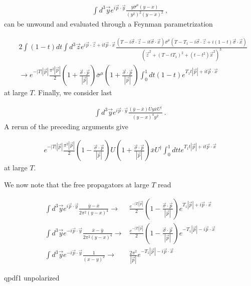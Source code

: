 \documentclass[11pt,aps,amsmath,amssymb,nofootinbib,notitlepage,longbibliography]{revtex4-1}
\begin{document}
\begin{align}
\int d^3 \vec{y}e^{i\vec{p}\cdot \vec{y}}\frac{y\bar \sigma^{\mu}(y-x)}{(y^2)^2(y-x)^2} \ ,
\end{align}
can be unwound and evaluated through a Feynman parametrization

\begin{align}
\label{T3}
&2\int (1-t)dt \int d^3 \vec{z}e^{i\vec{p}\cdot \vec{z}+it\vec{p}\cdot \vec{x}}\frac{(T-i\vec{\sigma} \cdot \vec{z}-it\vec{\sigma} \cdot \vec{x})\bar \sigma^{\mu}(T-T_1-i\vec{\sigma} \cdot \vec{z}+i(1-t)\vec{\sigma} \cdot \vec{x})}{(\vec{z}^2+(T-tT_1)^2+(t-t^2)\vec{x}^2)^3}\nonumber\\
&\rightarrow e^{-|T||\vec{p}|}\frac{\pi^2 |\vec{p}|}{2}(1+\frac{\vec{\sigma}\cdot \vec{p}}{|\vec{p}|})\bar \sigma^{\mu}(1+\frac{\vec{\sigma}\cdot \vec{p}}{|\vec{p}|})\int_{0}^{1}dt(1-t)e^{T_1t|\vec{p}|+it\vec{p}\cdot\vec{x}}
\end{align}
at large $T$.  Finally, we consider last

\begin{align}
\int d^3 \vec{y}e^{i\vec{p}\cdot \vec{y}}\frac{(\bar y-\bar x)Uy\bar xU^{\dagger}}{(y-x)^4y^2} \ .
\end{align}
A rerun of the preceding arguments give

\begin{align}
\label{T4}
e^{-|T||\vec{p}|}\frac{\pi^2 |\vec{p}|}{2}(1-\frac{\vec{\sigma}\cdot \vec{p}}{|\vec{p}|})U(1+\frac{\vec{\sigma}\cdot \vec{p}}{|\vec{p}|})\bar xU^{\dagger}\int_{0}^{1}dtte^{T_1t|\vec{p}|+it\vec{p}\cdot\vec{x}}
\end{align}
at large $T$.

We now note that the free propagators  at large $T$ read

\begin{align}
\label{T5}
\int d^3\vec{y}e^{i\vec{p}\cdot\vec{y}}\frac{\bar y -\bar x}{2\pi^2(y-x)^4}\rightarrow&  \frac{e^{-|T||\vec{p}|}}{2}(1-\frac{\vec{\sigma}\cdot \vec{p}}{|\vec{p}|})e^{T_1|\vec{p}|+i\vec{p}\cdot\vec{x}}\\
\int d^3\vec{y}e^{-i\vec{p}\cdot\vec{y}}\frac{\bar x -\bar y}{2\pi^2(y-x)^4}\rightarrow&  \frac{e^{-|T||\vec{p}|}}{2} (1-\frac{\vec{\sigma}\cdot \vec{p}}{|\vec{p}|})e^{-T_1|\vec{p}|-i\vec{p}\cdot\vec{x}}\\
\int d^3\vec{y}e^{-i\vec{p}\cdot\vec{y}}\frac{1}{(x-y)^2}\rightarrow& \frac{2\pi^2}{|\vec{p}|}e^{-T_1|\vec{p}|-i\vec{p}\cdot\vec{x}}
\end{align}

qpdf1 unpolarized
\end{document}
